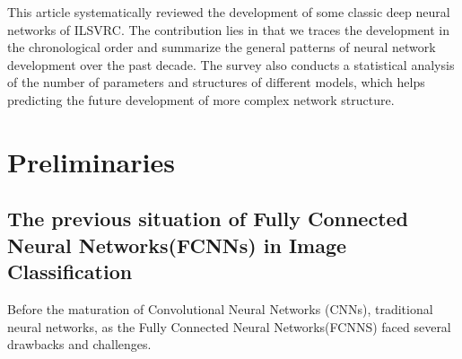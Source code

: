 \documentclass[a4paper]{article}
\begin{document}
This article systematically reviewed the development of some classic deep neural networks of ILSVRC. The contribution lies in that we traces the development in the chronological order and summarize the general patterns of neural network development over the past decade. The survey also  conducts a statistical analysis of the number of parameters and structures of different models, which helps predicting the future development of more complex network structure.


\section{Preliminaries}


\subsection{The previous situation of Fully Connected Neural Networks(FCNNs) in Image Classification}
Before the maturation of Convolutional Neural Networks (CNNs)\citep{726791}, traditional neural networks, as the Fully Connected Neural Networks(FCNNS) faced several drawbacks and challenges.
\end{document}
